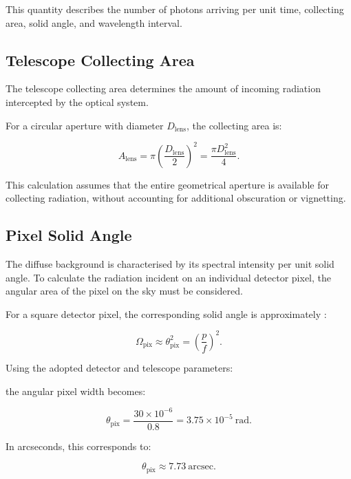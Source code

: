 \documentclass{article}
\begin{document}
This quantity describes the number of photons arriving per unit time, collecting area, solid angle, and wavelength interval.

\subsection{Telescope Collecting Area}

The telescope collecting area determines the amount of incoming radiation intercepted by the optical system.

For a circular aperture with diameter $D_{\mathrm{lens}}$, the collecting area is:

\begin{equation}
A_{\mathrm{lens}}
=
\pi\left(\frac{D_{\mathrm{lens}}}{2}\right)^2
=
\frac{\pi D_{\mathrm{lens}}^2}{4}.
\end{equation}

This calculation assumes that the entire geometrical aperture is available for collecting radiation, without accounting for additional obscuration or vignetting.

\subsection{Pixel Solid Angle}

The diffuse background is characterised by its spectral intensity per unit solid angle. To calculate the radiation incident on an individual detector pixel, the angular area of the pixel on the sky must be considered.

For a square detector pixel, the corresponding solid angle is approximately \cite{usgs_pp1769_chapter24}:

\begin{equation}
\Omega_{\mathrm{pix}}
\approx
\theta_{\mathrm{pix}}^2
=
\left(\frac{p}{f}\right)^2.
\end{equation}

Using the adopted detector and telescope parameters:

the angular pixel width becomes:

\begin{equation}
\theta_{\mathrm{pix}}
=
\frac{30\times10^{-6}}{0.8}
=
3.75\times10^{-5}\ \mathrm{rad}.
\end{equation}

In arcseconds, this corresponds to:

\begin{equation}
\theta_{\mathrm{pix}}
\approx 7.73\ \mathrm{arcsec}.
\end{equation}
\end{document}
